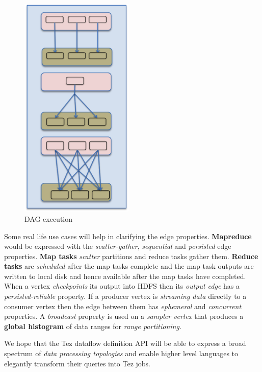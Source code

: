 \documentclass[twocolumn]{article}
\begin{document}
\begin{figure}[htb]
        \centering
        \includegraphics[width=0.48\textwidth]{tez31}
        \caption{DAG execution}
        \label{fig05}
\end{figure}

Some real life use cases will help in clarifying the edge properties.
\textbf{Mapreduce} would be expressed with the \emph{scatter-gather},
\emph{sequential} and \emph{persisted} edge properties. \textbf{Map
tasks} \emph{scatter} partitions and reduce tasks gather them.
\textbf{Reduce tasks} are \emph{scheduled} after the map tasks complete
and the map task outputs are written to local disk and hence available
after the map tasks have completed. When a vertex \emph{checkpoints} its
output into HDFS then its \emph{output edge} has a
\emph{persisted-reliable} property. If a producer vertex is
\emph{streaming data} directly to a consumer vertex then the edge
between them has \emph{ephemeral} and \emph{concurrent} properties. A
\emph{broadcast} property is used on a \emph{sampler vertex} that
produces a \textbf{global histogram} of data ranges for \emph{range
partitioning}.

We hope that the Tez dataflow definition API will be able to express a
broad spectrum of \emph{data processing topologies} and enable higher
level languages to elegantly transform their queries into Tez jobs.
\end{document}
